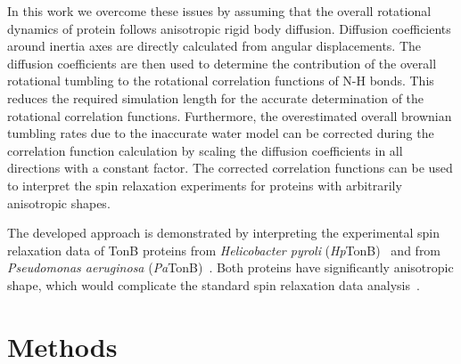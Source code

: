 \documentclass[pre,aps,floatfix,authordate1-4,twocolumn]{revtex4-1}
\begin{document}
In this work we overcome these issues by assuming that the overall
rotational dynamics of protein follows anisotropic rigid body diffusion.
Diffusion coefficients around inertia axes are 
directly calculated from angular displacements.
The diffusion coefficients are then used to determine the
contribution of the overall rotational tumbling to the 
rotational correlation functions of N-H bonds.
This reduces the required simulation length for the accurate determination
of the rotational correlation functions. Furthermore, the overestimated
overall brownian tumbling rates due to the inaccurate water model
can be corrected during the correlation function calculation by scaling
the diffusion coefficients in all directions with a constant factor.
The corrected correlation functions can be used to interpret the spin relaxation
experiments for proteins with arbitrarily anisotropic shapes.

The developed approach is demonstrated by interpreting the experimental spin relaxation data 
of TonB proteins from {\it Helicobacter pyroli} ({\it Hp}TonB)~\cite{ciragan16}
and from {\it Pseudomonas aeruginosa} ({\it Pa}TonB)~\cite{oeemig17}. Both proteins have significantly
anisotropic shape, which would complicate the standard spin relaxation data
analysis~\cite{woessner62,shimizu62,jarymowycz06,korzhnev01,luginbuhl97,hall04}.


\section{Methods}
\end{document}

